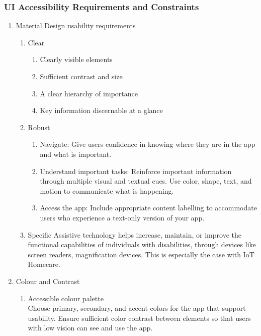 \documentclass[12pt]{article}
\begin{document}
{{    \subsubsection{UI Accessibility Requirements and Constraints}
     \begin{enumerate}
   \item Material Design usability requirements

   		\begin{enumerate}
    		\item{Clear}
            	\begin{enumerate}
                	\item{Clearly visible elements}
                    \item{Sufficient contrast and size}
                    \item{A clear hierarchy of importance}
                    \item{Key information discernable at a glance}
            	\end{enumerate}
        	\item{Robust}
            	\begin{enumerate}
                	\item{Navigate: Give users confidence in knowing where they are in the app and what is important.}
                    \item{Understand important tasks: Reinforce important information through multiple visual and textual cues. Use color, shape, text, and motion to communicate what is happening.}
                    \item{Access the app: Include appropriate content labelling to accommodate users who experience a text-only version of your app.}
            	\end{enumerate}
        	\item{Specific}
            Assistive technology helps increase, maintain, or improve the functional capabilities of individuals with disabilities, through devices like screen readers, magnification devices. This is especially the case with IoT Homecare.
        \end{enumerate}
   \item Colour and Contrast
     \begin{enumerate}
       \item Accessible colour palette\\
       Choose primary, secondary, and accent colors for the app that support usability. Ensure sufficient color contrast between elements so that users with low vision can see and use the app.


\end{enumerate}
\end{enumerate}}}
\end{document}

